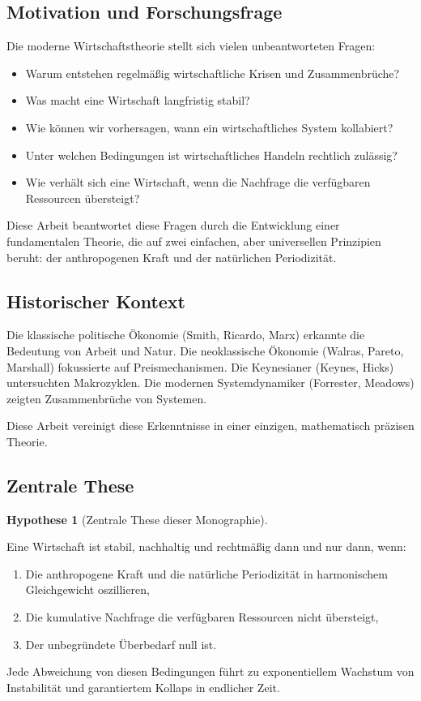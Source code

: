 \documentclass[a4paper, 12pt, twoside, openright]{report}
\theoremstyle{definition}
\theoremstyle{definition}
\newtheorem{hypothese}{Hypothese}[chapter]
\begin{document}
\subsection{Motivation und Forschungsfrage}

Die moderne Wirtschaftstheorie stellt sich vielen unbeantworteten Fragen:

\begin{itemize}
    \item Warum entstehen regelmäßig wirtschaftliche Krisen und Zusammenbrüche?
    \item Was macht eine Wirtschaft langfristig stabil?
    \item Wie können wir vorhersagen, wann ein wirtschaftliches System kollabiert?
    \item Unter welchen Bedingungen ist wirtschaftliches Handeln rechtlich zulässig?
    \item Wie verhält sich eine Wirtschaft, wenn die Nachfrage die verfügbaren Ressourcen übersteigt?
\end{itemize}

Diese Arbeit beantwortet diese Fragen durch die Entwicklung einer fundamentalen Theorie, die auf zwei einfachen, aber universellen Prinzipien beruht: der anthropogenen Kraft und der natürlichen Periodizität.

\subsection{Historischer Kontext}

Die klassische politische Ökonomie (Smith, Ricardo, Marx) erkannte die Bedeutung von Arbeit und Natur. Die neoklassische Ökonomie (Walras, Pareto, Marshall) fokussierte auf Preismechanismen. Die Keynesianer (Keynes, Hicks) untersuchten Makrozyklen. Die modernen Systemdynamiker (Forrester, Meadows) zeigten Zusammenbrüche von Systemen.

Diese Arbeit vereinigt diese Erkenntnisse in einer einzigen, mathematisch präzisen Theorie.

\subsection{Zentrale These}

\begin{hypothese}[Zentrale These dieser Monographie]
    \label{hyp:zentral}
    
    Eine Wirtschaft ist stabil, nachhaltig und rechtmäßig dann und nur dann, wenn:
    
    \begin{enumerate}
        \item Die anthropogene Kraft und die natürliche Periodizität in harmonischem Gleichgewicht oszillieren,
        \item Die kumulative Nachfrage die verfügbaren Ressourcen nicht übersteigt,
        \item Der unbegründete Überbedarf null ist.
    \end{enumerate}
    
    Jede Abweichung von diesen Bedingungen führt zu exponentiellem Wachstum von Instabilität und garantiertem Kollaps in endlicher Zeit.
\end{hypothese}
\end{document}
